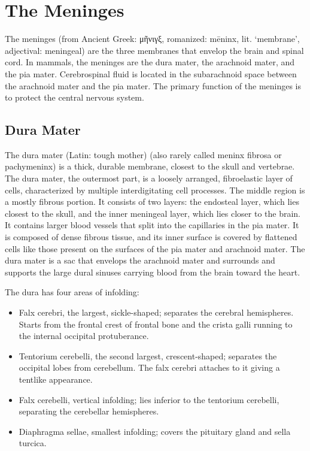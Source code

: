 \hypertarget{the-meninges}{%
\section{The Meninges}\label{the-meninges}}

The meninges (from Ancient Greek: μῆνιγξ, romanized: mēninx, lit. `membrane', adjectival: meningeal) are the three membranes that envelop the brain and spinal cord. In mammals, the meninges are the dura mater, the arachnoid mater, and the pia mater. Cerebrospinal fluid is located in the subarachnoid space between the arachnoid mater and the pia mater. The primary function of the meninges is to protect the central nervous system.

\hypertarget{dura-mater}{%
\subsection{Dura Mater}\label{dura-mater}}

The dura mater (Latin: tough mother) (also rarely called meninx fibrosa or pachymeninx) is a thick, durable membrane, closest to the skull and vertebrae. The dura mater, the outermost part, is a loosely arranged, fibroelastic layer of cells, characterized by multiple interdigitating cell processes. The middle region is a mostly fibrous portion. It consists of two layers: the endosteal layer, which lies closest to the skull, and the inner meningeal layer, which lies closer to the brain. It contains larger blood vessels that split into the capillaries in the pia mater. It is composed of dense fibrous tissue, and its inner surface is covered by flattened cells like those present on the surfaces of the pia mater and arachnoid mater. The dura mater is a sac that envelops the arachnoid mater and surrounds and supports the large dural sinuses carrying blood from the brain toward the heart.

The dura has four areas of infolding:

\begin{itemize}
\tightlist
\item
  Falx cerebri, the largest, sickle-shaped; separates the cerebral hemispheres. Starts from the frontal crest of frontal bone and the crista galli running to the internal occipital protuberance.
\item
  Tentorium cerebelli, the second largest, crescent-shaped; separates the occipital lobes from cerebellum. The falx cerebri attaches to it giving a tentlike appearance.
\item
  Falx cerebelli, vertical infolding; lies inferior to the tentorium cerebelli, separating the cerebellar hemispheres.
\item
  Diaphragma sellae, smallest infolding; covers the pituitary gland and sella turcica.
\end{itemize}

